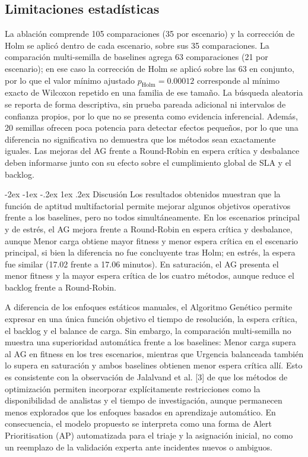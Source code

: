 \documentclass[12pt,a4paper,twocolumn]{article}
\makeatletter
\renewcommand{\section}{\@startsection{section}{1}{\z@}%
  {-2ex \@plus -1ex \@minus -.2ex}%
  {1ex \@plus.2ex}%
  {\fontsize{12}{14}\selectfont\bfseries}}
\makeatother
\begin{document}
\subsection*{Limitaciones estadísticas}
La ablación comprende 105 comparaciones (35 por escenario) y la corrección de Holm se aplicó dentro de cada escenario, sobre sus 35 comparaciones. La comparación multi-semilla de baselines agrega 63 comparaciones (21 por escenario); en ese caso la corrección de Holm se aplicó sobre las 63 en conjunto, por lo que el valor mínimo ajustado $p_\mathrm{Holm}=0.00012$ corresponde al mínimo exacto de Wilcoxon repetido en una familia de ese tamaño. La búsqueda aleatoria se reporta de forma descriptiva, sin prueba pareada adicional ni intervalos de confianza propios, por lo que no se presenta como evidencia inferencial. Además, 20 semillas ofrecen poca potencia para detectar efectos pequeños, por lo que una diferencia no significativa no demuestra que los métodos sean exactamente iguales. Las mejoras del AG frente a Round-Robin en espera crítica y desbalance deben informarse junto con su efecto sobre el cumplimiento global de SLA y el backlog.

\section{Discusión}
Los resultados obtenidos muestran que la función de aptitud multifactorial permite mejorar algunos objetivos operativos frente a los baselines, pero no todos simultáneamente. En los escenarios principal y de estrés, el AG mejora frente a Round-Robin en espera crítica y desbalance, aunque Menor carga obtiene mayor fitness y menor espera crítica en el escenario principal, si bien la diferencia no fue concluyente tras Holm; en estrés, la espera fue similar (17.02 frente a 17.06 minutos). En saturación, el AG presenta el menor fitness y la mayor espera crítica de los cuatro métodos, aunque reduce el backlog frente a Round-Robin.

A diferencia de los enfoques estáticos manuales, el Algoritmo Genético permite expresar en una única función objetivo el tiempo de resolución, la espera crítica, el backlog y el balance de carga. Sin embargo, la comparación multi-semilla no muestra una superioridad automática frente a los baselines: Menor carga supera al AG en fitness en los tres escenarios, mientras que Urgencia balanceada también lo supera en saturación y ambos baselines obtienen menor espera crítica allí. Esto es consistente con la observación de Jalalvand et al. [3] de que los métodos de optimización permiten incorporar explícitamente restricciones como la disponibilidad de analistas y el tiempo de investigación, aunque permanecen menos explorados que los enfoques basados en aprendizaje automático. En consecuencia, el modelo propuesto se interpreta como una forma de Alert Prioritisation (AP) automatizada para el triaje y la asignación inicial, no como un reemplazo de la validación experta ante incidentes nuevos o ambiguos.
\end{document}
